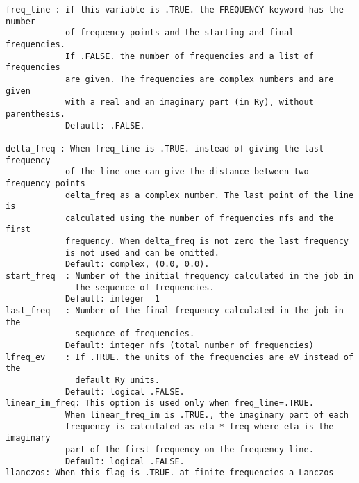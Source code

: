 \documentclass[12pt,a4paper]{article}
\begin{document}
\begin{verbatim}
freq_line : if this variable is .TRUE. the FREQUENCY keyword has the number 
            of frequency points and the starting and final frequencies. 
            If .FALSE. the number of frequencies and a list of frequencies 
            are given. The frequencies are complex numbers and are given 
            with a real and an imaginary part (in Ry), without parenthesis.
            Default: .FALSE.

delta_freq : When freq_line is .TRUE. instead of giving the last frequency 
            of the line one can give the distance between two frequency points
            delta_freq as a complex number. The last point of the line is 
            calculated using the number of frequencies nfs and the first 
            frequency. When delta_freq is not zero the last frequency 
            is not used and can be omitted.
            Default: complex, (0.0, 0.0).
start_freq  : Number of the initial frequency calculated in the job in
              the sequence of frequencies.
            Default: integer  1
last_freq   : Number of the final frequency calculated in the job in the
              sequence of frequencies.
            Default: integer nfs (total number of frequencies)
lfreq_ev    : If .TRUE. the units of the frequencies are eV instead of the
              default Ry units.
            Default: logical .FALSE.
linear_im_freq: This option is used only when freq_line=.TRUE. 
            When linear_freq_im is .TRUE., the imaginary part of each 
            frequency is calculated as eta * freq where eta is the imaginary 
            part of the first frequency on the frequency line.
            Default: logical .FALSE.
llanczos: When this flag is .TRUE. at finite frequencies a Lanczos 


\end{verbatim}
\end{document}

